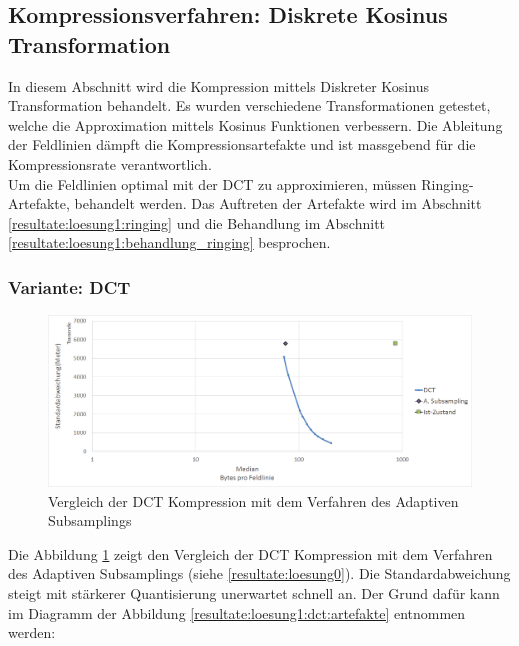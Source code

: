 \subsection{Kompressionsverfahren: Diskrete Kosinus Transformation} \label{resultate:loesung1}
In diesem Abschnitt wird die Kompression mittels Diskreter Kosinus Transformation behandelt. Es wurden verschiedene Transformationen getestet, welche die Approximation mittels Kosinus Funktionen verbessern. Die Ableitung der Feldlinien dämpft die Kompressionsartefakte und ist massgebend für die Kompressionsrate verantwortlich.\\
Um die Feldlinien optimal mit der DCT zu approximieren, müssen Ringing-Artefakte, behandelt werden. Das Auftreten der Artefakte wird im Abschnitt \ref{resultate:loesung1:ringing} und die Behandlung im Abschnitt \ref{resultate:loesung1:behandlung_ringing} besprochen.

\subsubsection{Variante: DCT}\label{resultate:dct}

\begin{figure}[!htbp]
	\center
	\includegraphics[width=1\textwidth,keepaspectratio]{./pictures/resultate/loesung1/loesung1-0/loesung1_0.png}
	\caption{Vergleich der DCT Kompression mit dem Verfahren des Adaptiven Subsamplings}
	\label{resultate:loesung1:dct:resultate}
\end{figure}
Die Abbildung \ref{resultate:loesung1:dct:resultate} zeigt den Vergleich der DCT Kompression mit dem Verfahren des Adaptiven Subsamplings (siehe \ref{resultate:loesung0}). Die Standardabweichung steigt mit stärkerer Quantisierung unerwartet schnell an. Der Grund dafür kann im Diagramm der Abbildung \ref{resultate:loesung1:dct:artefakte} entnommen werden:

